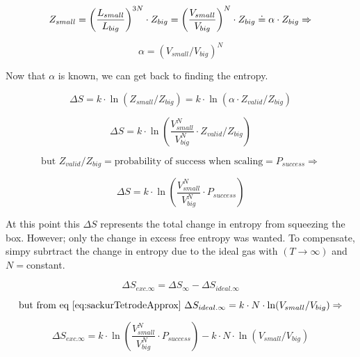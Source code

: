 \begin{equation}\label{eq:MCHS17}
\newline Z_{small}=\left(\frac{L_{small}}{L_{big}}\right)^{3N}\cdot Z_{big}=\left(\frac{V_{small}}{V_{big}}\right)^N\cdot Z_{big}\doteq\alpha\cdot Z_{big} \Rightarrow
\end{equation}

\begin{equation}\label{eq:MCHS18}
\alpha=(V_{small}/V_{big})^N
\end{equation}

Now that $\alpha$ is known, we can get back to finding the entropy.

\begin{equation}\label{eq:MCHS19}
\Delta S=k\cdot \ln(Z_{small}/Z_{big})=k\cdot \ln(\alpha\cdot Z_{valid}/Z_{big})
\end{equation}

\begin{equation}\label{eq:MCHS20}
\Delta S=k\cdot \ln(\frac{V_{small}^N}{V_{big}^N}\cdot Z_{valid}/Z_{big})
\end{equation}

\begin{equation}\label{eq:MCHS21}
\text{but }Z_{valid}/Z_{big}=\text{probability of success when scaling}=P_{success}\Rightarrow
\end{equation}

\begin{equation}\label{eq:MCHS22}
\Delta S=k\cdot \ln(\frac{V_{small}^N}{V_{big}^N}\cdot P_{success}
)
\end{equation}

At this point this $\Delta S$ represents the total change in entropy from squeezing the box. However; only the change in excess free entropy was wanted. To compensate, simpy subrtract the change in entropy due to the ideal gas with $(T\rightarrow\infty)$ and $N=$constant.

\begin{equation}\label{eq:MCHS23}
\Delta S_{exc.\infty}=\Delta S_{\infty}-\Delta S_{ideal.\infty}
\end{equation}

\begin{equation}\label{eq:MCHS24}
\text{but from eq~\ref{eq:sackurTetrodeApprox} }\Delta S_{ideal.\infty}=k\cdot N\cdot \ln(V_{small}/V_{big})\Rightarrow
\end{equation}

\begin{equation}\label{eq:MCHS25}
\Delta S_{exc.\infty}=k\cdot \ln(\frac{V_{small}^N}{V_{big}^N}\cdot P_{success})-k\cdot N\cdot \ln(V_{small}/V_{big})
\end{equation}

